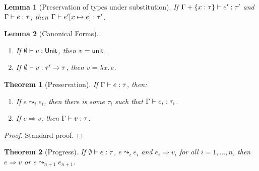 \documentclass[12pt,a2paper,draft]{article}
\newcommand{\abstr}[2]{\ensuremath{\lambda{#1}.\,{#2}}}
\newcommand{\unit}{\ensuremath{\normalfont\textsf{unit}}}
\newcommand{\Unit}{\ensuremath{\normalfont\textsf{Unit}}}
\newcommand{\Tj}[3]{\mbox{\ensuremath{{#1}\vdash{#2}:{#3}}}}
\newcommand{\tj}[2]{\Tj{\emptyset}{#1}{#2}}
\newtheorem{lemma}{Lemma}
\newtheorem{theorem}{Theorem}
\begin{document}
\begin{lemma}[Preservation of types under substitution] \label{lemma:Preservation_of_types_under_substitution}
  If $\Tj{\Gamma + \{x:\tau\}}{e'}{\tau'}$ and $\Tj{\Gamma}{e}{\tau}$,
  then $\Tj{\Gamma}{e'[x \mapsto e]}{\tau'}$.
\end{lemma}

\begin{lemma}[Canonical Forms] \label{lemma:Canonical_Forms} \
  \begin{enumerate}
  \item If $\tj{v}{\Unit}$, then $v = \unit$.
  \item If $\tj{v}{\tau' \to \tau}$, then $v = \abstr{x}{e}$.
  \end{enumerate}
\end{lemma}

\begin{theorem}[Preservation] \label{theorem:Preservation}
  If $\Tj{\Gamma}{e}{\tau}$, then:
  \begin{enumerate}
  \item If $e \leadsto_i e_i$, then there is some $\tau_i$ such that $\Tj{\Gamma}{e_i}{\tau_i}$.
  \item If $e \Rightarrow v$, then $\Tj{\Gamma}{v}{\tau}$.
  \end{enumerate}
\end{theorem}

\begin{proof}
  Standard proof.
\end{proof}

\begin{theorem}[Progress] \label{theorem:Progress}
  If $\tj{e}{\tau}$, $e \leadsto_i e_i$ and $e_i \Rightarrow v_i$ for all $i=1,\ldots,n$, then
  $e \Rightarrow v$ or $e \leadsto_{n+1} e_{n+1}$.
\end{theorem}
\end{document}

